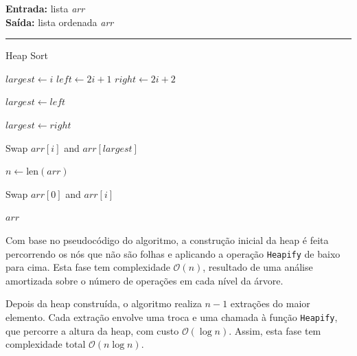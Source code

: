\documentclass[conference]{IEEEtran}
\begin{document}
\begin{algorithm}[H]
    \raggedright
    \vspace{.1em}
    \textbf{Entrada:} lista \textit{arr} \\
    \textbf{Saída:} lista ordenada \textit{arr} \\
    \vspace{.5em}
    \hrule 
    \caption{Heap Sort}
    \begin{algorithmic}[1]
            \State $largest \gets i$
            \State $left \gets 2i + 1$
            \State $right \gets 2i + 2$
    
                \State $largest \gets left$
            \EndIf
    
                \State $largest \gets right$
            \EndIf
    
                \State Swap $arr[i]$ and $arr[largest]$
                \State {}
            \EndIf
        \EndFunction
    
            \State $n \gets \text{len}(arr)$
    
                \State {}
            \EndFor
    
                \State Swap $arr[0]$ and $arr[i]$
                \State {}
            \EndFor
    
            \State \Return $arr$
        \EndFunction
    
        \State {}
    \end{algorithmic}
\end{algorithm}

Com base no pseudocódigo do algoritmo, a construção inicial da heap é feita percorrendo os nós que não são folhas e aplicando a operação \texttt{Heapify} de baixo para cima. Esta fase tem complexidade \(\mathcal{O}(n)\), resultado de uma análise amortizada sobre o número de operações em cada nível da árvore.

Depois da heap construída, o algoritmo realiza \(n - 1\) extrações do maior elemento. Cada extração envolve uma troca e uma chamada à função \texttt{Heapify}, que percorre a altura da heap, com custo \(\mathcal{O}(\log n)\). Assim, esta fase tem complexidade total \(\mathcal{O}(n \log n)\).
\end{document}
